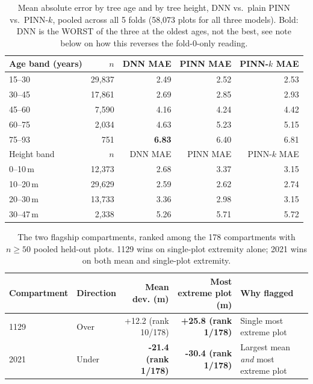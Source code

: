\documentclass[logo,msc,ai]{infthesis}           %
\begin{document}
\begin{table}[H]
\centering
\small
\begin{tabular}{lrrrr}
\toprule
Age band (years) & $n$ & DNN MAE & PINN MAE & PINN-$k$ MAE \\
\midrule
15--30 & 29,837 & 2.49 & 2.52 & 2.53 \\
30--45 & 17,861 & 2.69 & 2.85 & 2.93 \\
45--60 & 7,590 & 4.16 & 4.24 & 4.42 \\
60--75 & 2,034 & 4.63 & 5.23 & 5.15 \\
75--93 & 751 & \textbf{6.83} & 6.40 & 6.81 \\
\midrule
Height band & $n$ & DNN MAE & PINN MAE & PINN-$k$ MAE \\
\midrule
0--10\,m & 12,373 & 2.68 & 3.37 & 3.15 \\
10--20\,m & 29,629 & 2.59 & 2.62 & 2.74 \\
20--30\,m & 13,733 & 3.36 & 2.98 & 3.15 \\
30--47\,m & 2,338 & 5.26 & 5.71 & 5.72 \\
\bottomrule
\end{tabular}
\caption{\small{Mean absolute error by tree age and by tree height, DNN vs.\ plain PINN vs.\
PINN-$k$, pooled across all 5 folds (58,073 plots for all three models). Bold: DNN is the
WORST of the three at the oldest ages, not the best, see note below on how this reverses the
fold-0-only reading.}} %
\label{tab:age-height-error}
\end{table}

\begin{table}[H]
\centering
\small
\begin{tabular}{llrrp{3.3cm}}
\toprule
Compartment & Direction & Mean dev. (m) & Most extreme plot (m) & Why flagged \\
\midrule
1129 & Over & +12.2 (rank 10/178) & \textbf{+25.8 (rank 1/178)} & Single most extreme plot \\
2021 & Under & \textbf{-21.4 (rank 1/178)} & \textbf{-30.4 (rank 1/178)} & Largest mean \emph{and} most extreme plot \\
\bottomrule
\end{tabular}
\caption{\small{The two flagship compartments, ranked among the 178 compartments with
$n\geq50$ pooled held-out plots. 1129 wins on single-plot extremity alone; 2021 wins on both
mean and single-plot extremity.}}
\label{tab:productivity-flagships}
\end{table}
\end{document}
